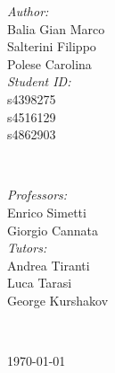 \begin{titlepage}
\begin{minipage}{0.4\textwidth}
\begin{flushleft} \large
\emph{Author:}\\[0.2cm]
Balia Gian Marco \\
Salterini Filippo \\
Polese Carolina
\\[1.2em]
\emph{Student ID:}\\[0.2cm]
s4398275 \\
s4516129 \\
s4862903 
\end{flushleft}
\end{minipage}
~
\begin{minipage}{0.4\textwidth}
\begin{flushright} \large
\emph{Professors:} \\[0.2cm]
Enrico Simetti\\
Giorgio Cannata  \\[1.2em] %

\emph{Tutors:} \\[0.2cm]
Andrea Tiranti\\
Luca Tarasi\\
George Kurshakov
\end{flushright}
\end{minipage}\\[2cm]
\makeatother



{\large \today}\\[2cm] %

\vfill %

\end{titlepage}